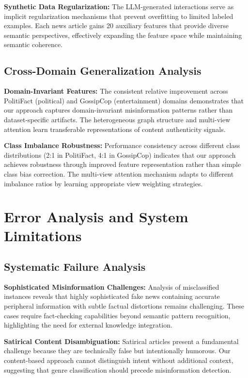 \textbf{Synthetic Data Regularization:} The LLM-generated interactions serve as implicit regularization mechanisms that prevent overfitting to limited labeled examples. Each news article gains 20 auxiliary features that provide diverse semantic perspectives, effectively expanding the feature space while maintaining semantic coherence.

\subsection{Cross-Domain Generalization Analysis}

\textbf{Domain-Invariant Features:} The consistent relative improvement across PolitiFact (political) and GossipCop (entertainment) domains demonstrates that our approach captures domain-invariant misinformation patterns rather than dataset-specific artifacts. The heterogeneous graph structure and multi-view attention learn transferable representations of content authenticity signals.

\textbf{Class Imbalance Robustness:} Performance consistency across different class distributions (2:1 in PolitiFact, 4:1 in GossipCop) indicates that our approach achieves robustness through improved feature representation rather than simple class bias correction. The multi-view attention mechanism adapts to different imbalance ratios by learning appropriate view weighting strategies.

\section{Error Analysis and System Limitations}

\subsection{Systematic Failure Analysis}

\textbf{Sophisticated Misinformation Challenges:} Analysis of misclassified instances reveals that highly sophisticated fake news containing accurate peripheral information with subtle factual distortions remains challenging. These cases require fact-checking capabilities beyond semantic pattern recognition, highlighting the need for external knowledge integration.

\textbf{Satirical Content Disambiguation:} Satirical articles present a fundamental challenge because they are technically false but intentionally humorous. Our content-based approach cannot distinguish intent without additional context, suggesting that genre classification should precede misinformation detection.

